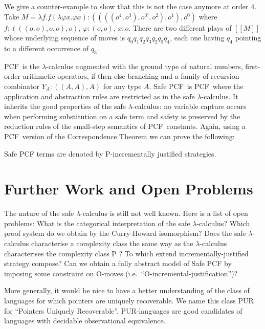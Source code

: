 \documentclass{llncs}
\newcommand{\sem}[1]{{[\![ #1 ]\!]}}
\newcommand\ialgol{\textsf{IA}}
\newcommand\pcf{\textsf{PCF}}
\begin{document}
We give a counter-example to show that this is not the case anymore at order $4$. Take $M = \lambda f . f (\lambda \varphi x . \varphi x) : ((((o^4,o^3),o^{3'},o^2),o^1),o^0)$ where $f:(((o,o),o,o),o)$, $\varphi:(o,o)$, $x:o$. There are two different plays of $\sem{M}$ whose underlying sequence of moves is $q_0 q_1 q_2 q_3 q_2 q_3 q_4$, each one having $q_4$ pointing to a different occurrence of $q_3$.


\pcf\ is the $\lambda$-calculus augmented with the ground type of natural numbers, first-order arithmetic operators, if-then-else branching
and a family of recursion combinator $Y_A : ((A,A),A)$ for any type $A$.
Safe \pcf\ is \pcf\ where the application and abstraction rules are restricted as in the safe $\lambda$-calculus.
It inherits the good properties of the safe $\lambda$-calculus: no variable capture occurs when performing substitution on a safe term and safety is preserved by the reduction rules of the small-step semantics of \pcf\ constants. Again, using a \pcf\ version of the Correspondence Theorem we can prove the following:
\begin{theorem}
\label{thm:safepcfpincr}
Safe PCF terms are denoted by P-incrementally justified strategies.
\end{theorem}


\section{Further Work and Open Problems}

The nature of the safe $\lambda$-calculus is still not well known. Here is a list of open problems:
What is the categorical interpretation of the safe $\lambda$-calculus? Which proof system do we obtain by the Curry-Howard isomorphism? Does the safe $\lambda$-calculus characterise a complexity class the same way as the $\lambda$-calculus characterises the complexity class P \cite{DBLP:conf/tlca/LeivantM93}?
To which extend incrementally-justified strategy compose? Can we obtain a fully abstract model of Safe PCF by imposing some constraint on O-moves (i.e.\ ``O-incremental-justification'')?



More generally, it would be nice to have a better understanding of the class of languages for which pointers are uniquely recoverable. We name this class PUR for ``Pointers Uniquely Recoverable''. PUR-languages are good candidates of languages with decidable observational equivalence.
\end{document}

